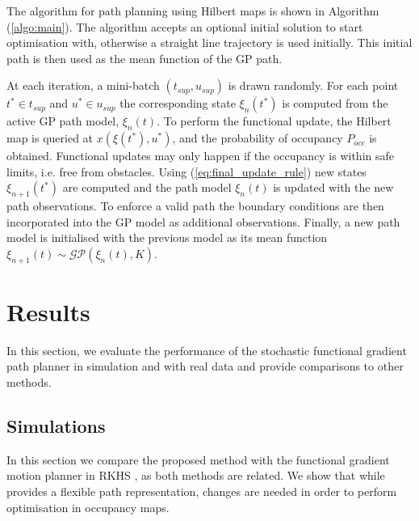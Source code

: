 \documentclass[letterpaper, 10 pt, conference]{ieeeconf}  %
\begin{document}
The algorithm for path planning using Hilbert maps is shown in Algorithm (\ref{algo:main}). The algorithm accepts an optional initial solution to start optimisation with, otherwise a straight line trajectory is used initially. This initial path is then used as the mean function of the GP path. %
   
At each iteration, a mini-batch $(t_{sup}, u_{sup})$ is drawn randomly. For each point $t^* \in t_{sup}$ and $u^* \in u_{sup}$ the corresponding state $\xi_{n}(t^*)$ is computed from the active GP path model, $\xi_{n}(t)$. To perform the functional update, the Hilbert map is queried at $x(\xi(t^*),u^*)$, and the probability of occupancy $P_{occ}$ is obtained. Functional updates may only happen if the occupancy is within safe limits, i.e. free from obstacles. Using (\ref{eq:final_update_rule}) new states $\xi_{n+1}(t^*)$ are computed and the path model $\xi_n(t)$ is updated with the new path observations. To enforce a valid path the boundary conditions are then incorporated into the GP model as additional observations. Finally, a new path model is initialised with the previous model as its mean function ${\xi}_{n+1}(t) \sim \mathcal{GP}({\xi}_n(t),{K})$.  

\section{Results}\label{sec:Results}
In this section, we evaluate the performance of the stochastic functional gradient path planner in simulation and with real data and provide comparisons to other methods.

\subsection{Simulations}\label{subsec:simulation}

In this section we compare the proposed method with the functional gradient motion planner in RKHS \cite{Marinho2016}, as both methods are related. We show that while \cite{Marinho2016} provides a flexible path representation, changes are needed in order to perform optimisation in occupancy maps. 

\end{document}
